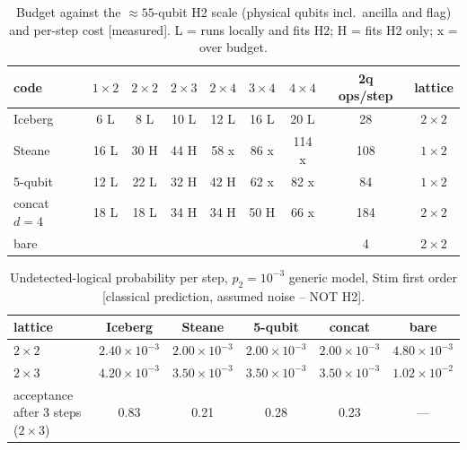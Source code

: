 \documentclass[11pt,a4paper]{article}
\newcommand{\tg}[1]{\textsf{\small[#1]}}
\newcommand{\mea}{\tg{measured}}
\newcommand{\cp}{\tg{classical prediction, assumed noise -- NOT H2}}
\begin{document}
\begin{table}[h]\centering\small
\caption{Budget against the $\approx55$-qubit H2 scale (physical qubits incl.\ ancilla and flag) and per-step
cost \mea. L = runs locally and fits H2; H = fits H2 only; x = over budget.}\label{tab:budget}
\begin{tabular}{lcccccc|cc}
\toprule
code & $1\times2$ & $2\times2$ & $2\times3$ & $2\times4$ & $3\times4$ & $4\times4$ & 2q ops/step & lattice\\
\midrule
Iceberg & 6 L & 8 L & 10 L & 12 L & 16 L & 20 L & 28 & $2\times2$\\
Steane & 16 L & 30 H & 44 H & 58 x & 86 x & 114 x & 108 & $1\times2$\\
5-qubit & 12 L & 22 L & 32 H & 42 H & 62 x & 82 x & 84 & $1\times2$\\
concat $d=4$ & 18 L & 18 L & 34 H & 34 H & 50 H & 66 x & 184 & $2\times2$\\
bare & & & & & & & 4 & $2\times2$\\
\bottomrule
\end{tabular}
\end{table}

\begin{table}[h]\centering\small
\caption{Undetected-logical probability per step, $p_2=10^{-3}$ generic model, Stim first order \cp.}\label{tab:resid}
\begin{tabular}{lccccc}
\toprule
lattice & Iceberg & Steane & 5-qubit & concat & bare\\
\midrule
$2\times2$ & $2.40\times10^{-3}$ & $2.00\times10^{-3}$ & $2.00\times10^{-3}$ & $2.00\times10^{-3}$ & $4.80\times10^{-3}$\\
$2\times3$ & $4.20\times10^{-3}$ & $3.50\times10^{-3}$ & $3.50\times10^{-3}$ & $3.50\times10^{-3}$ & $1.02\times10^{-2}$\\
acceptance after 3 steps ($2\times3$) & 0.83 & 0.21 & 0.28 & 0.23 & ---\\
\bottomrule
\end{tabular}
\end{table}
\end{document}
